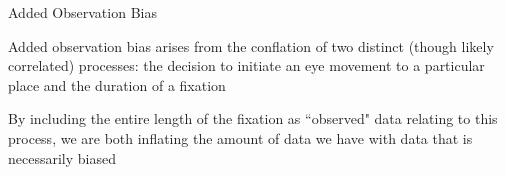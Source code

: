 \documentclass{beamer}
\newcommand{\vp}{\vspace{2mm}}
\providecommand{\cn}[1]{\textcolor{blue}{#1}}
\begin{document}
%
%
%
%
%


\begin{frame}{Added Observation Bias}


Added observation bias arises from the conflation of two distinct (though likely correlated) processes: the decision to initiate an eye movement to a particular place and the duration of a fixation \vspace{8mm}
%
%

By including the entire length of the fixation as ``observed" data relating to this process, we are both inflating the amount of data we have with data that is necessarily biased
\end{frame}
\end{document}
